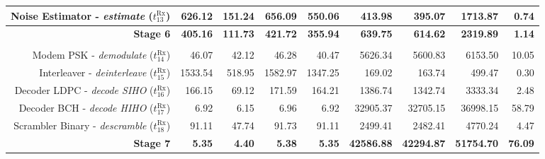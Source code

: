 \begin{table}[htp]
{{\begin{tabular}{r | r r r r  | r r r | r}
                  Noise Estimator -      \emph{estimate} ($t^\text{Rx}_{13}$) &          626.12  &           151.24  &           656.09  &                                 550.06  &           413.98  &           395.07  &          1713.87  &          0.74  \\ \hline
                                                             \textbf{Stage 6} &  \textbf{405.16} &   \textbf{111.73} &   \textbf{421.72} &                         \textbf{355.94} &   \textbf{639.75} &   \textbf{614.62} &  \textbf{2319.89} &  \textbf{1.14} \\ %
                                                                              &                  &                   &                   &                                         &                   &                   &                   &                \\
                        Modem PSK -    \emph{demodulate} ($t^\text{Rx}_{14}$) &           46.07  &            42.12  &            46.28  &                                  40.47  &          5626.34  &          5600.83  &          6153.50  &         10.05  \\
                      Interleaver -  \emph{deinterleave} ($t^\text{Rx}_{15}$) &         1533.54  &           518.95  &          1582.97  &                                1347.25  &           169.02  &           163.74  &           499.47  &          0.30  \\
                     Decoder LDPC -   \emph{decode SIHO} ($t^\text{Rx}_{16}$) &          166.15  &            69.12  &           171.59  &                                 164.21  &          1386.74  &          1342.74  &          3333.34  &          2.48  \\
                      Decoder BCH -   \emph{decode HIHO} ($t^\text{Rx}_{17}$) &            6.92  &             6.15  &             6.96  &                                   6.92  &         32905.37  &         32705.15  &         36998.15  &         58.79  \\
                 Scrambler Binary -    \emph{descramble} ($t^\text{Rx}_{18}$) &           91.11  &            47.74  &            91.73  &                                  91.11  &          2499.41  &          2482.41  &          4770.24  &          4.47  \\ \hline
    \rowcolor{Paired-1!15}                                   \textbf{Stage 7} &    \textbf{5.35} &     \textbf{4.40} &     \textbf{5.38} &                           \textbf{5.35} & \textbf{42586.88} & \textbf{42294.87} & \textbf{51754.70} & \textbf{76.09} \\ %

\end{tabular}}}
\end{table}
